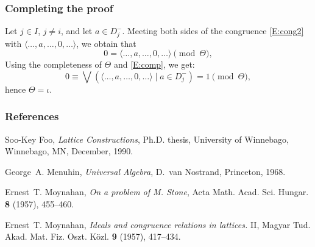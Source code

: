 \documentclass{beamer}
\begin{document}
\begin{frame}
\frametitle{Completing the proof}

Let $j \in I$, $j \neq i$, and let $a \in D_{j}^{-}$. 
Meeting both sides of the congruence \eqref{E:cong2} 
with $\langle \ldots, a, \ldots, 0, \ldots \rangle$, 
we obtain that
\begin{equation}\label{E:comp}
   0 = \langle \ldots, a, \ldots, 0, \ldots \rangle 
     \pmod{\Theta}, 
\end{equation}
Using the completeness of $\Theta$ and \eqref{E:comp}, 
we get:
\[
   0 \equiv \bigvee ( \langle \ldots, a, \ldots, 0, 
     \ldots \rangle \mid a \in D_{j}^{-} ) = 1 
     \pmod{\Theta}, 
\]
hence $\Theta = \iota$.
\end{frame}

\begin{frame}
\frametitle{References}

\begin{thebibliography}{9}

Soo-Key Foo, 
\emph{Lattice Constructions}, 
Ph.D. thesis, 
University of Winnebago, Winnebago, MN, December, 1990.

George~A. Menuhin, 
\emph{Universal Algebra}, 
D.~van Nostrand, Princeton, 1968.

Ernest~T. Moynahan, 
\emph{On a problem of M. Stone},
Acta Math. Acad. Sci. Hungar. \textbf{8} (1957), 
455--460.

Ernest~T. Moynahan, 
\emph{Ideals and congruence relations in lattices.} II,
Magyar Tud. Akad. Mat. Fiz. Oszt. K\"{o}zl. \textbf{9} 
(1957), 417--434.

\end{thebibliography}
\end{frame}
\end{document}
